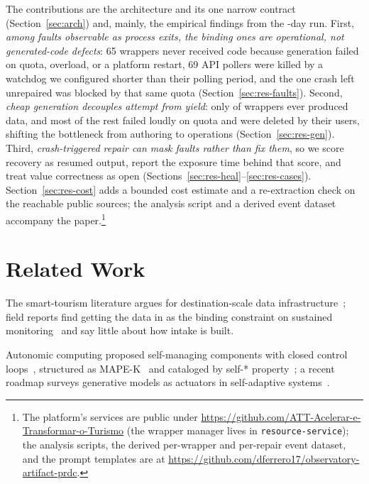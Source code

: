\documentclass[conference]{IEEEtran}
\newcommand{\coderepo}{\footnote{The platform's services are public under
\url{https://github.com/ATT-Acelerar-e-Transformar-o-Turismo} (the wrapper
manager lives in \texttt{resource-service}); the analysis scripts, the derived
per-wrapper and per-repair event dataset, and the prompt templates are at
\url{https://github.com/dferrero17/observatory-artifact-prdc}.}}
\begin{document}
The contributions are the architecture and its one narrow contract
(Section~\ref{sec:arch}) and, mainly, the empirical findings from the
\deploymentDays{}-day run. First, \emph{among faults observable as process exits,
the binding ones are operational, not generated-code defects}: 65 wrappers never
received code because generation failed
on quota, overload, or a platform restart, 69 API pollers were killed by a watchdog
we configured shorter than their polling period, and the one crash left unrepaired
was blocked by that same quota (Section~\ref{sec:res-faults}). Second, \emph{cheap generation
decouples attempt from yield}: only \nNonzeroPointWrappers{} of \nWrappers{} wrappers
ever produced data, and most of the rest failed loudly on quota and were deleted by
their users, shifting the bottleneck from authoring to operations
(Section~\ref{sec:res-gen}). Third, \emph{crash-triggered repair can mask faults
rather than fix them}, so we score recovery as resumed output, report the exposure
time behind that score, and treat value correctness as open
(Sections~\ref{sec:res-heal}--\ref{sec:res-cases}). Section~\ref{sec:res-cost}
adds a bounded cost estimate and a re-extraction check on the reachable public
sources; the analysis script and a derived event dataset accompany the paper.\coderepo

\section{Related Work}
\label{sec:related}

The smart-tourism literature argues for destination-scale data
infrastructure~\cite{gretzel2015smart,buhalis2013smart,ec2016etis}; field reports
find getting the data in as the binding constraint on sustained
monitoring~\cite{modica2018assessment,fuchs2014big,ivarsbaidal2021measuring,ivarsbaidal2023sustainable}
and say little about how intake is built.

Autonomic computing proposed self-managing components with closed control
loops~\cite{kephart2003vision}, structured as MAPE-K~\cite{ibm2005blueprint} and
cataloged by self-* property~\cite{huebscher2008autonomic}; a recent roadmap surveys
generative models as actuators in self-adaptive systems~\cite{li2024genaisas}.
\end{document}
